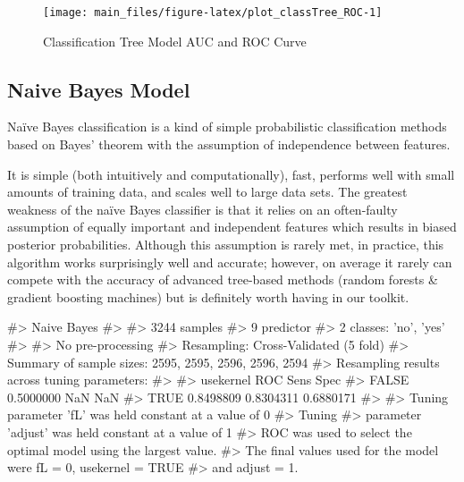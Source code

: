 \begin{Schunk}
\begin{figure}[H]

{\centering \texttt{[image: main\_files/figure-latex/plot\_classTree\_ROC-1]} 

}

\caption[Classification Tree Model AUC and ROC Curve]{Classification Tree Model AUC and ROC Curve}\label{fig:plot_classTree_ROC}
\end{figure}
\end{Schunk}

\hypertarget{naive-bayes-model}{%
\subsection{Naive Bayes Model}\label{naive-bayes-model}}

Naïve Bayes classification is a kind of simple probabilistic
classification methods based on Bayes' theorem with the assumption of
independence between features.

It is simple (both intuitively and computationally), fast, performs well
with small amounts of training data, and scales well to large data sets.
The greatest weakness of the naïve Bayes classifier is that it relies on
an often-faulty assumption of equally important and independent features
which results in biased posterior probabilities. Although this
assumption is rarely met, in practice, this algorithm works surprisingly
well and accurate; however, on average it rarely can compete with the
accuracy of advanced tree-based methods (random forests \& gradient
boosting machines) but is definitely worth having in our toolkit.

\begin{Schunk}
\begin{Soutput}
#> Naive Bayes 
#> 
#> 3244 samples
#>    9 predictor
#>    2 classes: 'no', 'yes' 
#> 
#> No pre-processing
#> Resampling: Cross-Validated (5 fold) 
#> Summary of sample sizes: 2595, 2595, 2596, 2596, 2594 
#> Resampling results across tuning parameters:
#> 
#>   usekernel  ROC        Sens       Spec     
#>   FALSE      0.5000000        NaN        NaN
#>    TRUE      0.8498809  0.8304311  0.6880171
#> 
#> Tuning parameter 'fL' was held constant at a value of 0
#> Tuning
#>  parameter 'adjust' was held constant at a value of 1
#> ROC was used to select the optimal model using the largest value.
#> The final values used for the model were fL = 0, usekernel = TRUE
#>  and adjust = 1.
\end{Soutput}
\end{Schunk}

